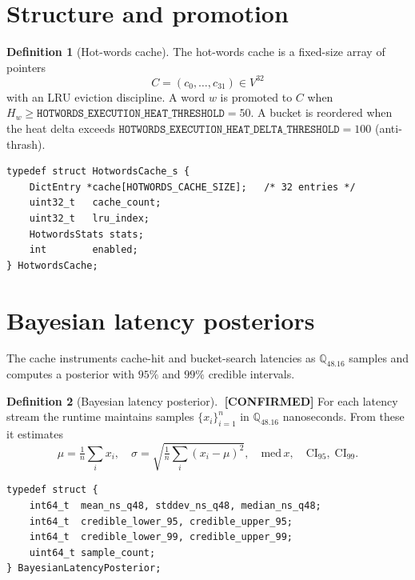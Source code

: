 \documentclass[11pt,letterpaper,openany]{book}
\theoremstyle{definition}
\newtheorem{definition}{Definition}[chapter]
\theoremstyle{plain}
\newcommand{\confirmed}{\textcolor{green!50!black}{\textbf{[CONFIRMED]}}\xspace}
\newcommand{\Qfp}{\mathbb{Q}_{48.16}}                %
\begin{document}
\section{Structure and promotion}

\begin{definition}[Hot-words cache]\label{def:hotwords}
The hot-words cache is a fixed-size array of pointers
\[
  C = (c_0,\dots,c_{31}) \in V^{32}
\]
with an LRU eviction discipline. A word $w$ is promoted to $C$ when
$H_w \ge \mathtt{HOTWORDS\_EXECUTION\_HEAT\_THRESHOLD} = 50$.
A bucket is reordered when the heat delta exceeds
$\mathtt{HOTWORDS\_EXECUTION\_HEAT\_DELTA\_THRESHOLD} = 100$
(anti-thrash).
\end{definition}

\begin{lstlisting}[caption={Hot-words cache state
  (\texttt{include/physics\_hotwords\_cache.h}:160--181).}]
typedef struct HotwordsCache_s {
    DictEntry *cache[HOTWORDS_CACHE_SIZE];   /* 32 entries */
    uint32_t   cache_count;
    uint32_t   lru_index;
    HotwordsStats stats;
    int        enabled;
} HotwordsCache;
\end{lstlisting}

\section{Bayesian latency posteriors}

The cache instruments cache-hit and bucket-search latencies as $\Qfp$
samples and computes a posterior with $95\%$ and $99\%$ credible
intervals.

\begin{definition}[Bayesian latency posterior]\label{def:bayes-posterior}
$\;$\confirmed
For each latency stream the runtime maintains samples $\{x_i\}_{i=1}^{n}$
in $\Qfp$ nanoseconds. From these it estimates
\[
  \mu = \tfrac{1}{n}\sum_i x_i,\quad
  \sigma = \sqrt{\tfrac{1}{n}\sum_i (x_i-\mu)^2},\quad
  \mathrm{med}\,x,\quad
  \mathrm{CI}_{95},\;\mathrm{CI}_{99}.
\]
\end{definition}

\begin{lstlisting}[caption={Posterior record
  (\texttt{include/physics\_hotwords\_cache.h}:247--257).}]
typedef struct {
    int64_t  mean_ns_q48, stddev_ns_q48, median_ns_q48;
    int64_t  credible_lower_95, credible_upper_95;
    int64_t  credible_lower_99, credible_upper_99;
    uint64_t sample_count;
} BayesianLatencyPosterior;
\end{lstlisting}
\end{document}
